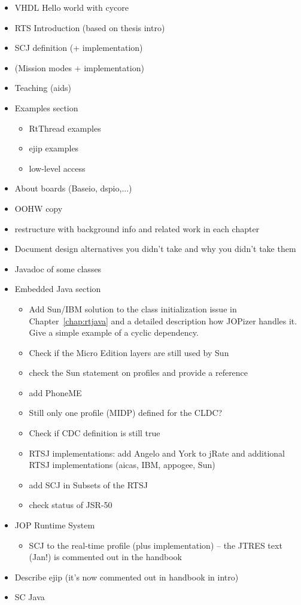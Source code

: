 \begin{itemize}
    \item VHDL Hello world with cycore
    \item RTS Introduction (based on thesis intro)
    \item SCJ definition (+ implementation)
    \item (Mission modes + implementation)
    \item Teaching (aids)
    \item Examples section
    \begin{itemize}
        \item RtThread examples
        \item ejip examples
        \item low-level access
    \end{itemize}
    \item About boards (Baseio, dspio,...)
    \item OOHW copy
    \item restructure with background info and related work in
        each chapter
    \item Document design alternatives you didn't take and why
        you didn't take them
    \item Javadoc of some classes
    \item Embedded Java section
    \begin{itemize}
        \item Add Sun/IBM solution to the class
            initialization issue in Chapter~\ref{chap:rtjava}
            and a detailed description how JOPizer handles
            it. Give a simple example of a cyclic dependency.
        \item Check if the Micro Edition layers are still
            used by Sun
        \item check the Sun statement on profiles and provide
            a reference
        \item add PhoneME
        \item Still only one profile (MIDP) defined for the
            CLDC?
        \item Check if CDC definition is still true
        \item RTSJ implementations: add Angelo and York to
            jRate and additional RTSJ implementations (aicas,
            IBM, appogee, Sun)
        \item add SCJ in Subsets of the RTSJ
        \item check status of JSR-50
    \end{itemize}
    \item JOP Runtime System
    \begin{itemize}
        \item SCJ to the real-time profile (plus
            implementation) -- the JTRES text (Jan!) is
            commented out in the handbook
    \end{itemize}
    \item Describe ejip (it's now commented out in handbook in
        intro)
    \item SC Java
\end{itemize}

